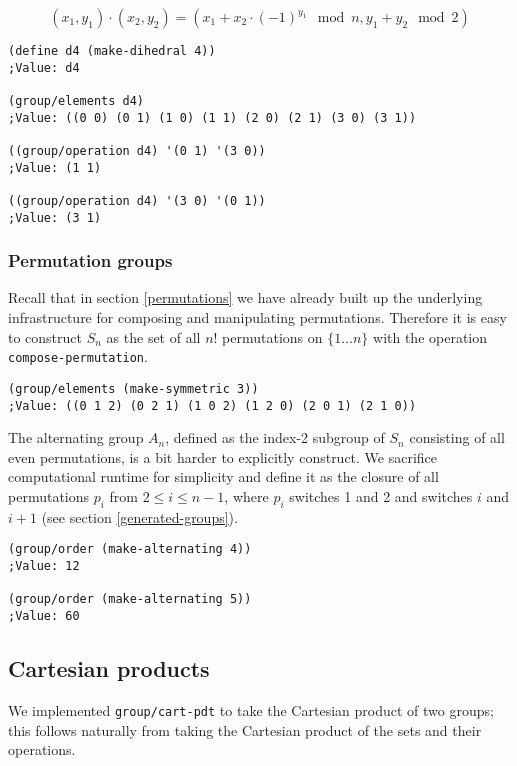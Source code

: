 \documentclass{article}
\begin{document}
                $$(x_1,y_1) \cdot (x_2,y_2) = (x_1 + x_2 \cdot (-1)^{y_1} \mod n, y_1 + y_2 \mod 2)$$
        
\begin{verbatim}
(define d4 (make-dihedral 4))
;Value: d4

(group/elements d4)
;Value: ((0 0) (0 1) (1 0) (1 1) (2 0) (2 1) (3 0) (3 1))

((group/operation d4) '(0 1) '(3 0))
;Value: (1 1)

((group/operation d4) '(3 0) '(0 1))
;Value: (3 1)
\end{verbatim}
        
            \subsubsection{Permutation groups}
                
                Recall that in section \ref{permutations} we have already built up the underlying infrastructure for composing and manipulating permutations. Therefore it is easy to construct $S_n$ as the set of all $n!$ permutations on $\{1\ldots n\}$ with the operation \texttt{compose-permutation}.

\begin{verbatim}
(group/elements (make-symmetric 3))
;Value: ((0 1 2) (0 2 1) (1 0 2) (1 2 0) (2 0 1) (2 1 0))
\end{verbatim}        

                The alternating group $A_n$, defined as the index-2 subgroup of $S_n$ consisting of all even permutations, is a bit harder to explicitly construct. We sacrifice computational runtime for simplicity and define it as the closure of all permutations $p_i$ from $2\leq i \leq n-1$, where $p_i$ switches 1 and 2 and switches $i$ and $i+1$ (see section \ref{generated-groups}).
		
\begin{verbatim}
(group/order (make-alternating 4))
;Value: 12

(group/order (make-alternating 5))
;Value: 60
\end{verbatim}
    
    	\subsection{Cartesian products}
            
            We implemented \texttt{group/cart-pdt} to take the Cartesian product of two groups; this follows naturally from taking the Cartesian product of the sets and their operations.
		
\end{document}
